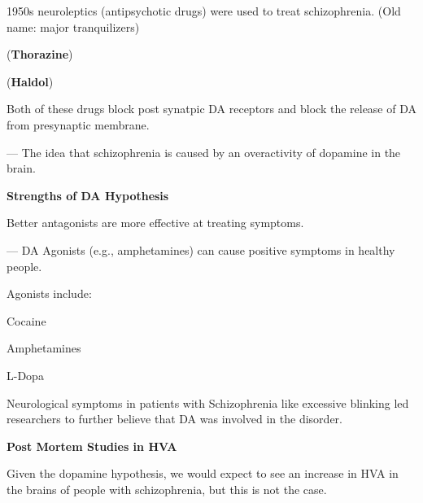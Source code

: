 \begin{coloredlist}
    \item 1950s neuroleptics (antipsychotic drugs) were used to treat schizophrenia. (Old name: major tranquilizers)
    \begin{coloredlist}
        \item {} (\textbf{Thorazine})
        \item {} (\textbf{Haldol})
        \item Both of these drugs block post synatpic DA receptors and block the release of DA from presynaptic membrane.
        \item {} — The idea that schizophrenia is caused by an overactivity of dopamine in the brain.
        \begin{coloredlist}
            \item \textbf{Strengths of DA Hypothesis}
            \begin{coloredlist}
                \item Better antagonists are more effective at treating symptoms.
                \item {} — DA Agonists (e.g., amphetamines) can cause positive symptoms in healthy people.
                \begin{coloredlist}
                    \item Agonists include:
                    \begin{coloredlist}
                        \item Cocaine
                        \item Amphetamines
                        \item L-Dopa
                    \end{coloredlist}
                \end{coloredlist}
                \item Neurological symptoms in patients with Schizophrenia like excessive blinking led researchers to further believe that DA was involved in the disorder.
            \end{coloredlist}
            \item \textbf{Post Mortem Studies in HVA}
            \begin{coloredlist}
                \item Given the dopamine hypothesis, we would expect to see an increase in HVA in the brains of people with schizophrenia, but this is not the case.

\end{coloredlist}
\end{coloredlist}
\end{coloredlist}
\end{coloredlist}
